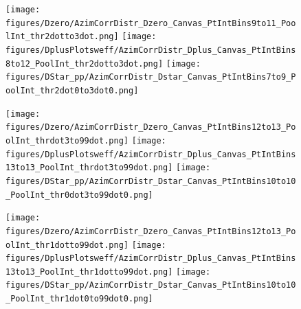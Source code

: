 \begin{figure}[!htbp]
\centering
{\texttt{[image: figures/Dzero/AzimCorrDistr\_Dzero\_Canvas\_PtIntBins9to11\_PoolInt\_thr2dotto3dot.png]}}
{\texttt{[image: figures/DplusPlotsweff/AzimCorrDistr\_Dplus\_Canvas\_PtIntBins8to12\_PoolInt\_thr2dotto3dot.png]}}
{\texttt{[image: figures/DStar\_pp/AzimCorrDistr\_Dstar\_Canvas\_PtIntBins7to9\_PoolInt\_thr2dot0to3dot0.png]}}




{\texttt{[image: figures/Dzero/AzimCorrDistr\_Dzero\_Canvas\_PtIntBins12to13\_PoolInt\_thrdot3to99dot.png]}}
{\texttt{[image: figures/DplusPlotsweff/AzimCorrDistr\_Dplus\_Canvas\_PtIntBins13to13\_PoolInt\_thrdot3to99dot.png]}}
{\texttt{[image: figures/DStar\_pp/AzimCorrDistr\_Dstar\_Canvas\_PtIntBins10to10\_PoolInt\_thr0dot3to99dot0.png]}}

{\texttt{[image: figures/Dzero/AzimCorrDistr\_Dzero\_Canvas\_PtIntBins12to13\_PoolInt\_thr1dotto99dot.png]}}
{\texttt{[image: figures/DplusPlotsweff/AzimCorrDistr\_Dplus\_Canvas\_PtIntBins13to13\_PoolInt\_thr1dotto99dot.png]}}
{\texttt{[image: figures/DStar\_pp/AzimCorrDistr\_Dstar\_Canvas\_PtIntBins10to10\_PoolInt\_thr1dot0to99dot0.png]}}



\end{figure}

